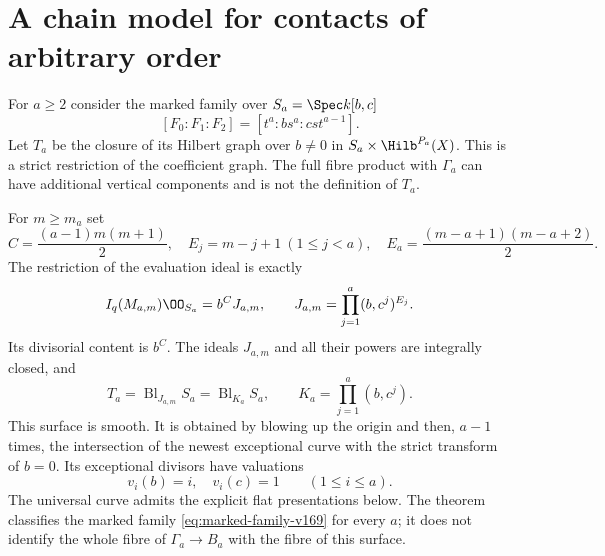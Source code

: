 \section{A chain model for contacts of arbitrary order}
\label{sec:chain-model-v169}
For $a\geq2$ consider the marked family over $S_a=\Spec k[b,c]$
\begin{equation}\label{eq:marked-family-v169}
 [F_0:F_1:F_2]=[t^a:b s^a:cst^{a-1}].
\end{equation}
Let $T_a$ be the closure of its Hilbert graph over $b\ne0$ in
$S_a\times\Hilb^{P_a}(X)$. This is a strict restriction of the
coefficient graph. The full fibre product with $\Gamma_a$ can have
additional vertical components and is not the definition of $T_a$.

\begin{theorem}\label{thm:chain-model-v169}
For $m\geq m_a$ set
\[
 C=\frac{(a-1)m(m+1)}2,\quad
 E_j=m-j+1\ (1\leq j<a),\quad
 E_a=\frac{(m-a+1)(m-a+2)}2.
\]
The restriction of the evaluation ideal is exactly
\begin{equation}\label{eq:all-order-factor-v169}
 I_q(M_{a,m})\OO_{S_a}
   =b^C J_{a,m},\qquad
 J_{a,m}=\prod_{j=1}^a(b,c^j)^{E_j}.
\end{equation}
Its divisorial content is $b^C$. The ideals $J_{a,m}$ and all their
powers are integrally closed, and
\begin{equation}\label{eq:chain-blowup-v169}
 T_a=\operatorname{Bl}_{J_{a,m}}S_a
     =\operatorname{Bl}_{K_a}S_a,
 \qquad K_a=\prod_{j=1}^a(b,c^j).
\end{equation}
This surface is smooth. It is obtained by blowing up the origin and
then, $a-1$ times, the intersection of the newest exceptional curve
with the strict transform of $b=0$. Its exceptional divisors have
valuations
\[
 v_i(b)=i,\quad v_i(c)=1\qquad(1\leq i\leq a).
\]
The universal curve admits the explicit flat presentations below.
The theorem classifies the marked family \eqref{eq:marked-family-v169}
for every $a$; it does not identify the whole fibre of $\Gamma_a\to B_a$
with the fibre of this surface.
\end{theorem}

